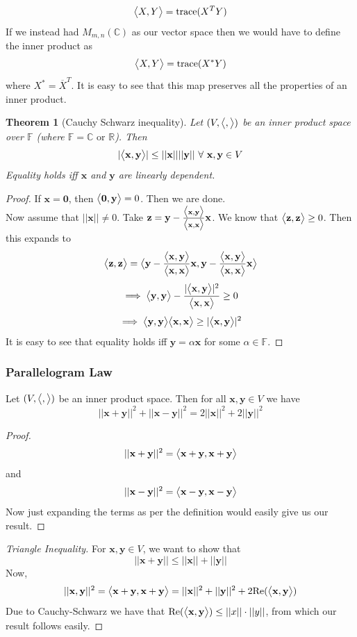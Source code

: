 \documentclass{article}
\newtheorem{theorem}{Theorem}
\begin{document}
$$\big{<}X,Y\big{>}=\text{trace}(X^{T}Y)$$
If we instead had $M_{m,n}(\mathbb{C})$ as our vector space then we would have to define the inner product as 
$$\big{<}X,Y\big{>}=\text{trace}(X^{*}Y)$$
where $X^{*}=\overline{X}^{T}$. It is easy to see that this map preserves all the properties of an inner product.
\begin{theorem}[Cauchy Schwarz inequality]
    Let $(V,\big{<},\big{>})$ be an inner product space over $\mathbb{F}$ (where $\mathbb{F}=\mathbb{C} \text{ or }\mathbb{R}$). Then 
    $$|\big{<}\mathbf{x},\mathbf{y}\big{>}|\leq ||\mathbf{x}|| ||\mathbf{y}|| \text{ }\forall \text{ }\mathbf{x},\mathbf{y}\in V$$
    Equality holds iff $\mathbf{x}$ and $\mathbf{y}$ are linearly dependent.
\end{theorem}
\begin{proof}
    If $\mathbf{x}=\mathbf{0}$, then $\big{<}\mathbf{0},\mathbf{y}\big{>}=0$. Then we are done.\\
    Now assume that $||\mathbf{x}||\neq 0$. Take $\mathbf{z}=\mathbf{y}-\frac{\big{<}\mathbf{x},\mathbf{y}\big{>}}{\big{<}\mathbf{x},\mathbf{x}\big{>}}\mathbf{x}$. We know that $\big{<}\mathbf{z},\mathbf{z}\big{>}\geq 0$. Then this expands to
    $$\big{<}\mathbf{z},\mathbf{z}\big{>}=\big{<}\mathbf{y}-\frac{\big{<}\mathbf{x},\mathbf{y}\big{>}}{\big{<}\mathbf{x},\mathbf{x}\big{>}}\mathbf{x},\mathbf{y}-\frac{\big{<}\mathbf{x},\mathbf{y}\big{>}}{\big{<}\mathbf{x},\mathbf{x}\big{>}}\mathbf{x}\big{>}$$
    $$\implies\big{<}\mathbf{y},\mathbf{y}\big{>}-\frac{|\big{<}\mathbf{x},\mathbf{y}\big{>}|^2}{\big{<}\mathbf{x},\mathbf{x}\big{>}}\geq 0$$
    $$\implies \big{<}\mathbf{y},\mathbf{y}\big{>}\big{<}\mathbf{x},\mathbf{x}\big{>}\geq |\big{<}\mathbf{x},\mathbf{y}\big{>}|^2$$
It is easy to see that equality holds iff $\mathbf{y}=\alpha\mathbf{x}$ for some $\alpha\in\mathbb{F}$.
\end{proof}


\subsubsection*{Parallelogram Law}
Let $(V,\big{<},\big{>})$ be an inner product space. Then for all $\mathbf{x},\mathbf{y}\in V$ we have
$$||\mathbf{x}+\mathbf{y}||^2+||\mathbf{x}-\mathbf{y}||^2=2||\mathbf{x}||^2+2||\mathbf{y}||^2$$
\begin{proof}
    $$||\mathbf{x}+\mathbf{y}||^2=\big{<}\mathbf{x}+\mathbf{y},\mathbf{x}+\mathbf{y}\big{>}$$
    and
    $$||\mathbf{x}-\mathbf{y}||^2=\big{<}\mathbf{x}-\mathbf{y},\mathbf{x}-\mathbf{y}\big{>}$$
Now just expanding the terms as per the definition would easily give us our result.
\end{proof}
\begin{proof}[Triangle Inequality]
    For $\mathbf{x},\mathbf{y}\in V$, we want to show that
    $$||\mathbf{x}+\mathbf{y}||\leq ||\mathbf{x}||+||\mathbf{y}||$$
    Now, 
    $$||\mathbf{x},\mathbf{y}||^2=\big{<}\mathbf{x}+\mathbf{y},\mathbf{x}+\mathbf{y}\big{>}=||\mathbf{x}||^2+||\mathbf{y}||^2+2\text{Re}(\big{<}\mathbf{x},\mathbf{y}\big{>})$$
    Due to Cauchy-Schwarz we have that $\text{Re}(\big{<}\mathbf{x},\mathbf{y}\big{>})\leq ||x||\cdot ||y||$, from which our result follows easily.
\end{proof}
\end{document}
